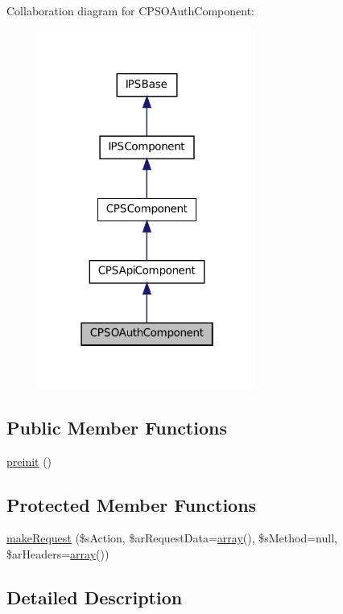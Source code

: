 Collaboration diagram for CPSOAuthComponent:\nopagebreak
\begin{figure}[H]
\begin{center}
\leavevmode
\includegraphics[width=202pt]{classCPSOAuthComponent__coll__graph}
\end{center}
\end{figure}
\subsection*{Public Member Functions}
\begin{DoxyCompactItemize}
\item 
\hyperlink{classCPSOAuthComponent_a2dc262e99b1c246b56f27626bfe699ff}{preinit} ()
\end{DoxyCompactItemize}
\subsection*{Protected Member Functions}
\begin{DoxyCompactItemize}
\item 
\hyperlink{classCPSOAuthComponent_a48bb515fcba316fcb3d741ce84b57cec}{makeRequest} (\$sAction, \$arRequestData=\hyperlink{list_8php_aa3205d038c7f8feb5c9f01ac4dfadc88}{array}(), \$sMethod=null, \$arHeaders=\hyperlink{list_8php_aa3205d038c7f8feb5c9f01ac4dfadc88}{array}())
\end{DoxyCompactItemize}


\subsection{Detailed Description}


